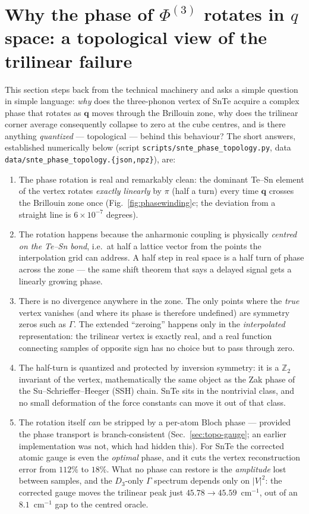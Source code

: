 \documentclass[11pt,a4paper]{article}
\newcommand{\qv}{\mathbf{q}}
\begin{document}
\section{Why the phase of $\Phi^{(3)}$ rotates in $q$ space: a topological
view of the trilinear failure}
\label{sec:topology}

This section steps back from the technical machinery and asks a simple
question in simple language: \emph{why} does the three-phonon vertex of
SnTe acquire a complex phase that rotates as $\qv$ moves through the
Brillouin zone, why does the trilinear corner average consequently
collapse to zero at the cube centres, and is there anything
\emph{quantized} --- topological --- behind this behaviour?  The short
answers, established numerically below
(script \texttt{scripts/snte\_phase\_topology.py}, data
\texttt{data/snte\_phase\_topology.\{json,npz\}}), are:

\begin{enumerate}
\item The phase rotation is real and remarkably clean: the dominant
  Te--Sn element of the vertex rotates \emph{exactly linearly} by $\pi$
  (half a turn) every time $\qv$ crosses the Brillouin zone once
  (Fig.~\ref{fig:phasewinding}c; the deviation from a straight line is
  $6\times10^{-7}$ degrees).
\item The rotation happens because the anharmonic coupling is physically
  \emph{centred on the Te--Sn bond}, i.e.\ at half a lattice vector from
  the points the interpolation grid can address.  A half step in real
  space is a half turn of phase across the zone --- the same shift
  theorem that says a delayed signal gets a linearly growing phase.
\item There is no divergence anywhere in the zone.  The only points
  where the \emph{true} vertex vanishes (and where its phase is
  therefore undefined) are symmetry zeros such as $\Gamma$.  The
  extended ``zeroing'' happens only in the \emph{interpolated}
  representation: the trilinear vertex is exactly real, and a real
  function connecting samples of opposite sign has no choice but to
  pass through zero.
\item The half-turn is quantized and protected by inversion symmetry:
  it is a $\mathbb{Z}_2$ invariant of the vertex, mathematically the
  same object as the Zak phase of the Su--Schrieffer--Heeger (SSH)
  chain.  SnTe sits in the nontrivial class, and no small deformation
  of the force constants can move it out of that class.
\item The rotation itself \emph{can} be stripped by a per-atom Bloch
  phase --- provided the phase transport is branch-consistent
  (Sec.~\ref{sec:topo-gauge}; an earlier implementation was not, which
  had hidden this).  For SnTe the corrected atomic gauge is even the
  \emph{optimal} phase, and it cuts the vertex reconstruction error
  from $112\%$ to $18\%$.  What no phase can restore is the
  \emph{amplitude} lost between samples, and the $D_3$-only $\Gamma$
  spectrum depends only on $|V|^2$: the corrected gauge moves the
  trilinear peak just $45.78\to45.59$~cm$^{-1}$, out of an
  $8.1$~cm$^{-1}$ gap to the centred oracle.
\end{enumerate}
\end{document}
